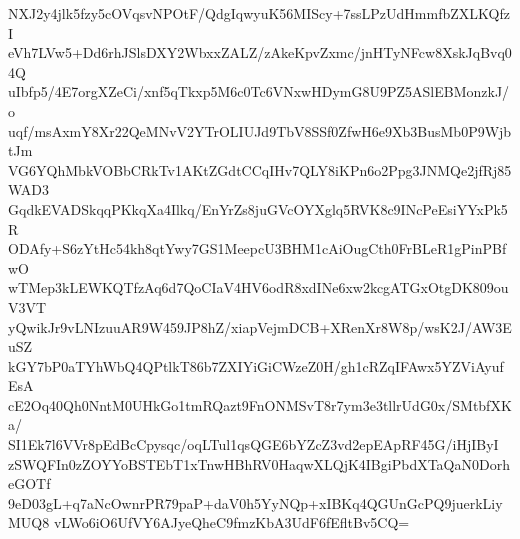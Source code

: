 NXJ2y4jlk5fzy5cOVqsvNPOtF/QdgIqwyuK56MIScy+7ssLPzUdHmmfbZXLKQfzI
eVh7LVw5+Dd6rhJSlsDXY2WbxxZALZ/zAkeKpvZxmc/jnHTyNFcw8XskJqBvq04Q
uIbfp5/4E7orgXZeCi/xnf5qTkxp5M6c0Tc6VNxwHDymG8U9PZ5ASlEBMonzkJ/o
uqf/msAxmY8Xr22QeMNvV2YTrOLIUJd9TbV8SSf0ZfwH6e9Xb3BusMb0P9WjbtJm
VG6YQhMbkVOBbCRkTv1AKtZGdtCCqIHv7QLY8iKPn6o2Ppg3JNMQe2jfRj85WAD3
GqdkEVADSkqqPKkqXa4Ilkq/EnYrZs8juGVcOYXglq5RVK8c9INcPeEsiYYxPk5R
ODAfy+S6zYtHc54kh8qtYwy7GS1MeepcU3BHM1cAiOugCth0FrBLeR1gPinPBfwO
wTMep3kLEWKQTfzAq6d7QoCIaV4HV6odR8xdINe6xw2kcgATGxOtgDK809ouV3VT
yQwikJr9vLNIzuuAR9W459JP8hZ/xiapVejmDCB+XRenXr8W8p/wsK2J/AW3EuSZ
kGY7bP0aTYhWbQ4QPtlkT86b7ZXIYiGiCWzeZ0H/gh1cRZqIFAwx5YZViAyufEsA
cE2Oq40Qh0NntM0UHkGo1tmRQazt9FnONMSvT8r7ym3e3tllrUdG0x/SMtbfXKa/
SI1Ek7l6VVr8pEdBcCpysqc/oqLTul1qsQGE6bYZcZ3vd2epEApRF45G/iHjIByI
zSWQFIn0zZOYYoBSTEbT1xTnwHBhRV0HaqwXLQjK4IBgiPbdXTaQaN0DorheGOTf
9eD03gL+q7aNcOwnrPR79paP+daV0h5YyNQp+xIBKq4QGUnGcPQ9juerkLiyMUQ8
vLWo6iO6UfVY6AJyeQheC9fmzKbA3UdF6fEfltBv5CQ=
